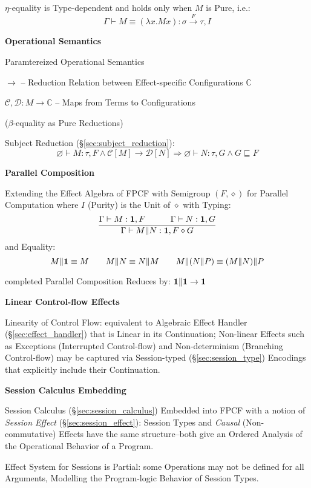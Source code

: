 $\eta$-equality is Type-dependent and holds only when $M$ is Pure,
i.e.:
\[
  \Gamma \vdash M \equiv (\lambda x.M x):\sigma \xrightarrow{F} \tau,I
\]


\textbf{Operational Semantics}

Paramtereized Operational Semantics

$\rightarrow$ -- Reduction Relation between Effect-specific
Configurations $\mathbb{C}$

$\mathcal{C},\mathcal{D} : M \rightarrow \mathbb{C}$ -- Maps from
Terms to Configurations

($\beta$-equality as Pure Reductions) %

Subject Reduction (\S\ref{sec:subject_reduction}):
\[
  \varnothing \vdash M:\tau,F \wedge \mathcal{C}[M]
    \rightarrow \mathcal{D}[N]
  \Rightarrow \varnothing \vdash N:\tau,G \wedge G \sqsubseteq F
\]


\textbf{Parallel Composition}

Extending the Effect Algebra of FPCF with Semigroup $(F,\diamond)$ for
Parallel Computation where $I$ (Purity) is the Unit of $\diamond$ with
Typing:
\[
  \frac{\Gamma \vdash M:\mathbf{1},F \quad\quad\quad \Gamma \vdash N:\mathbf{1},G}
  {\Gamma \vdash M\|N:\mathbf{1},F \diamond G}
\]
and Equality:
\[
  M\|\mathbf{1} \equiv M \quad\quad M\|N \equiv N\|M
    \quad\quad M\|(N\|P) \equiv (M\|N)\|P
\]

completed Parallel Composition Reduces by: $\mathbf{1}\|\mathbf{1}
\rightarrow \mathbf{1}$


\textbf{Linear Control-flow Effects}

Linearity of Control Flow: equivalent to Algebraic Effect Handler
(\S\ref{sec:effect_handler}) that is Linear in its Continuation;
Non-linear Effects such as Exceptions (Interrupted Control-flow) and
Non-determinism (Branching Control-flow) may be captured via
Session-typed (\S\ref{sec:session_type}) Encodings that explicitly
include their Continuation. %


\asterism


\textbf{Session Calculus Embedding}

Session Calculus (\S\ref{sec:session_calculus}) Embedded into FPCF
with a notion of \emph{Session Effect} (\S\ref{sec:session_effect}):
Session Types and \emph{Causal} (Non-commutative) Effects have the
same structure--both give an Ordered Analysis of the Operational
Behavior of a Program.

Effect System for Sessions is Partial: some Operations may not be
defined for all Arguments, Modelling the Program-logic Behavior of
Session Types.

